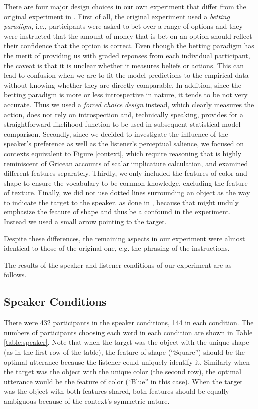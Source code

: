 There are four major design choices in our own experiment that differ
from the original experiment in \cite{Frank}. First of all, the
original experiment used a \emph{betting paradigm}, i.e., participants
were asked to bet over a range of options and they were instructed
that the amount of money that is bet on an option should reflect their
confidence that the option is correct. Even though the betting
paradigm has the merit of providing us with graded reponses from each
individual participant, the caveat is that it is unclear whether it
measures beliefs or actions. This can lead to confusion when we are to
fit the model predictions to the empirical data without knowing
whether they are directly comparable. In addition, since the betting
paradigm is more or less introspective in nature, it tends to be not
very accurate. Thus we used a \emph{forced choice design} instead,
which clearly measures the action, does not rely on introspection and,
technically speaking, provides for a straightforward likelihood
function to be used in subsequent statistical model comparison.
Secondly, since we decided to investigate the influence of the
speaker's preference as well as the listener's perceptual salience, we
focused on contexts equivalent to Figure \ref{context}, which require
reasoning that is highly reminiscent of Gricean accounts of scalar
implicature calculation, and examined different features separately.
Thirdly, we only included the features of color and shape to ensure
the vocabulary to be common knowledge, excluding the feature of
texture. Finally, we did not use dotted lines surrounding an object as
the way to indicate the target to the speaker, as done in \cite{Frank},
because that might unduly emphasize the feature of shape and thus be a
confound in the experiment. Instead we used a small arrow pointing to
the target.

Despite these differences, the remaining aspects in our experiment
were almost identical to those of the original one, e.g. the phrasing
of the instructions.

The results of the speaker and listener conditions of our experiment
are as follows.

 
\subsection{Speaker Conditions}

There were 432 participants in the speaker conditions, 144 in each condition. The numbers of participants choosing each word in each condition are shown in Table \ref{table:speaker}. Note that when the target was the object with the unique shape (as in the first row of the table), the feature of shape (``Square'') should be the optimal utterance because the listener could uniquely identify it. Similarly when the target was the object with the unique color (the second row), the optimal utterance would be the feature of color (``Blue'' in this case). When the target was the object with both features shared, both features should be equally ambiguous because of the context's symmetric nature.


